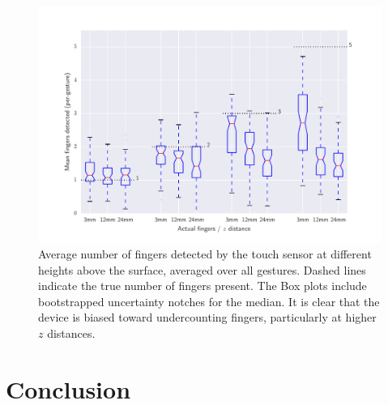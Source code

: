 \documentclass{l4proj}
\begin{document}
\begin{figure}
    \centering
    \includegraphics[width=1.0\linewidth]{images/boxplot_finger_distance.pdf}    

    \caption{Average number of fingers detected by the touch sensor at different heights above the surface, averaged over all gestures. Dashed lines indicate
    the true number of fingers present. The Box plots include bootstrapped uncertainty notches for the median. It is clear that the device is biased toward 
    undercounting fingers, particularly at higher $z$ distances.
    }

    \label{fig:boxplot} 
\end{figure}


\chapter{Conclusion}  
\end{document}
